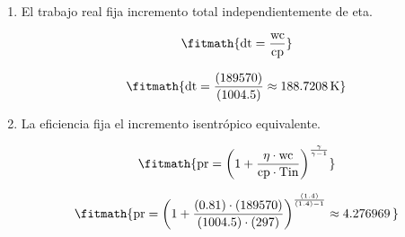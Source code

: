 \begin{enumerate}

\item El trabajo real fija incremento total independientemente de eta.

\[\fitmath{\mathrm{dt}=\frac{\mathrm{wc}}{\mathrm{cp}}}\]

\[\fitmath{\mathrm{dt}=\frac{(189570)}{(1004.5)}\approx 188.7208\,\mathrm{K}}\]

\item La eficiencia fija el incremento isentrópico equivalente.

\[\fitmath{\mathrm{pr}={\left(1+\frac{\eta\cdot \mathrm{wc}}{\mathrm{cp}\cdot \mathrm{Tin}}\right)}^{\frac{\gamma}{\gamma-1}}}\]

\[\fitmath{\mathrm{pr}={\left(1+\frac{(0.81)\cdot (189570)}{(1004.5)\cdot (297)}\right)}^{\frac{(1.4)}{(1.4)-1}}\approx 4.276969\,}\]

\end{enumerate}
